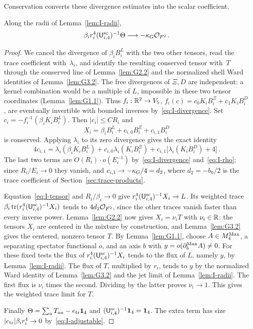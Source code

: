 Conservation converts these divergence estimates into the scalar coefficient.
\begin{proposition}\label{prop:I-coefficient}
Along the radii of Lemma~\ref{lem:I-radii},
\begin{equation}\label{eq:I-coefficient}
\beta_ir_i^4(\mathsf{U}_{i,4}^{\mathrm{sc}})^{-1}\Theta\longrightarrow-\kappa_G\mathcal{O}_{F^2}\,.
\end{equation}
\end{proposition}
\begin{proof}
We cancel the divergence of $\beta_iB_i^L$ with the two other tensors, read the trace coefficient with~$\lambda_i$, and identify the resulting conserved tensor with~$T$ through the conserved line of Lemma~\ref{lem:G2.2} and the normalized shell Ward identities of Lemma~\ref{lem:G3.2}. The free divergences of $\Xi,D$ are independent: a kernel combination would be a multiple of $L$, impossible in these two tensor coordinates (Lemma~\ref{lem:G1.1}). Thus $f_i:\mathbb{R}^2\to V_5$, $f_i(c)=c_0K_iB_i^\Xi+c_1K_iB_i^D$, are eventually invertible with bounded inverses by~\eqref{eq:I-divergence}. Set $c_i=-f_i^{-1}(\beta_iK_iB_i^L)$. Then $|c_i|\le CR_i$ and
\begin{equation*}
X_i=\beta_iB_i^L+c_{i,0}B_i^\Xi+c_{i,1}B_i^D
\end{equation*}
is conserved. Applying $\lambda_i$ to its zero divergence gives the exact identity
\begin{equation*}
4c_{i,1}=\lambda_i(\beta_iK_iB_i^L)+c_{i,0}\lambda_i(K_iB_i^\Xi)
+c_{i,1}\big[\lambda_i(K_iB_i^D)+4\big]\,.
\end{equation*}
The last two terms are $O(R_i)\cdot o(E_i^{-1})$ by~\eqref{eq:I-divergence} and~\eqref{eq:I-rho}; since $R_i/E_i\to0$ they vanish, and $c_{i,1}\to-\kappa_G/4=d_2$, where $d_2=-b_0/2$ is the trace coefficient of Section~\ref{sec:trace-products}.

Equation~\eqref{eq:I-tensor} and $R_i/\beta_i\to0$ give $r_i^4(\mathsf{U}_{i,4}^{\mathrm{sc}})^{-1}X_i\to L$. Its weighted trace $\beta_i\operatorname{tr}(r_i^4(\mathsf{U}_{i,4}^{\mathrm{sc}})^{-1}X_i)$ tends to $4d_2\mathcal{O}_{F^2}$, since the other traces vanish faster than every inverse power. Lemma~\ref{lem:G2.2} now gives $X_i=\nu_iT$ with $\nu_i\in\mathbb{R}$: the tensors $X_i$ are centered in the mixture by construction, and Lemma~\ref{lem:G3.2} gives the centered, nonzero tensor $T$. By Lemma~\ref{lem:G1.1}, choose $A\in M_{4}^{\mathrm{Max}}$, a separating spectator functional $o$, and an axis $b$ with $y=o(\partial_b^{\rm Max}A)\ne0$. For these fixed tests the flux of $r_i^4(\mathsf{U}_{i,4}^{\mathrm{sc}})^{-1}X_i$ tends to the flux of $L$, namely $y$, by Lemma~\ref{lem:I-radii}. The flux of $T$, multiplied by $r_i$, tends to $y$ by the normalized Ward identity of Lemma~\ref{lem:G3.2} and the jet limit of Lemma~\ref{lem:I-radii}. The first flux is $\nu_i$ times the second. Dividing by the latter proves $\nu_i\to1$. This gives the weighted trace limit for $T$.

Finally $\Theta=\sum_aT_{aa}-e_{\rm tr}\mathbf{1}_{4}$ and $(\mathsf{U}_{i,4}^{\mathrm{sc}})^{-1}\mathbf{1}_{4}=\mathbf{1}_{4}$. The extra term has size $|e_{\rm tr}|\beta_ir_i^4\to0$ by~\eqref{eq:I-adjustable}.
\end{proof}


